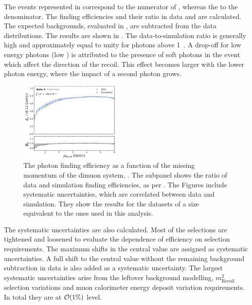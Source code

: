 The events represented in  correspond to the numerator of , whereas the  to the denominator.
The finding efficiencies and their ratio in data and \MC are calculated.
The expected backgrounds, evaluated in \MC, are subtracted from the data distributions.
The results are shown in .
The data-to-simulation ratio is generally high and approximately equal to unity for photons above 1~\gev.
A drop-off for low energy photons (low \pRecoil) is attributed to the presence of soft \ISR photons in the event which affect the direction of the recoil.
This effect becomes larger with the lower photon energy, where the impact of a second \ISR photon grows.
\begin{figure}[htbp!]
    \centering
    \includegraphics[width=0.45\textwidth]{figures/data_sim_corrections/pyth_data_mc_agreement_pRecoil.pdf}
    \caption{\label{fig:data_mc_photon_eff} The photon finding efficiency as a function of the missing momentum of the dimuon system, \pRecoil.
    The subpanel shows the ratio of data and simulation finding efficiencies, as per .
    The Figures include systematic uncertainties, which are correlated between data and simulation.
    They show the results for the datasets of a size equivalent to the ones used in this analysis.
    }
\end{figure}

The systematic uncertainties are also calculated.
Most of the selections are tightened and loosened to evaluate the dependence of efficiency on selection requirements.
The maximum shifts in the central value are assigned as systematic uncertainties.
A full shift to the central value without the remaining background subtraction in data is also added as a systematic uncertainty.
The largest systematic uncertainties arise from the leftover background modelling, $m^2_{\mathrm{Recoil}}$ selection variations and muon calorimeter energy deposit variation requirements.
In total they are at ${\cal O}(1\%)$ level.

